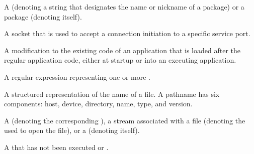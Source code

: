 \begin{glossary-list}
%
%
A  (denoting a string that designates the name or
nickname of a package) or a package (denoting itself).


%
%
A socket that is used to accept a connection initiation to a specific service
port.


\glent[patch]
%
%
%
A modification to the existing code of an application that is loaded after the
regular application code, either at startup or into an executing application.


%
%
%
%
A regular expression representing one or more .


\glent[pathname]
%
%
A structured representation of the name of a file. A pathname has six
components: host, device, directory, name, type, and version.


%

A  (denoting the corresponding ), a stream
associated with a file (denoting the  used to open the file),
or a  (denoting itself).


%
%
%
%
%
A  that has not been executed or .


%
%
%


\end{glossary-list}
